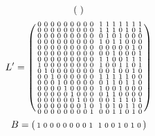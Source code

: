 \begin{example}
{\begin{equation*}
\begin{psmallmatrix}
        \end{psmallmatrix}
    \end{equation*}
    \begin{equation*}
        \setcounter{MaxMatrixCols}{17}
        L^\prime = \begin{psmallmatrix}
            0 & 0 & 0 & 0 & 0 & 0 & 0 & 0 & 0 & & 1 & 1 & 1 & 1 & 1 & 1 & 1 \\
            0 & 0 & 0 & 0 & 0 & 0 & 0 & 0 & 0 & & 1 & 1 & 1 & 0 & 1 & 0 & 1 \\
            0 & 0 & 0 & 0 & 0 & 0 & 0 & 0 & 0 & & 0 & 1 & 0 & 1 & 0 & 0 & 0 \\
            0 & 0 & 0 & 0 & 0 & 0 & 0 & 0 & 0 & & 1 & 0 & 1 & 1 & 0 & 0 & 0 \\
            0 & 0 & 0 & 0 & 0 & 0 & 0 & 0 & 0 & & 0 & 0 & 0 & 0 & 0 & 1 & 0 \\
            0 & 0 & 0 & 0 & 0 & 0 & 0 & 0 & 0 & & 0 & 0 & 1 & 0 & 0 & 0 & 1 \\
            0 & 0 & 0 & 0 & 0 & 0 & 0 & 0 & 0 & & 1 & 1 & 0 & 0 & 1 & 1 & 1 \\
            1 & 0 & 0 & 0 & 0 & 0 & 0 & 0 & 0 & & 1 & 0 & 0 & 1 & 1 & 0 & 1 \\
            0 & 1 & 0 & 0 & 0 & 0 & 0 & 0 & 0 & & 0 & 0 & 1 & 0 & 0 & 1 & 0 \\
            0 & 0 & 1 & 0 & 0 & 0 & 0 & 0 & 0 & & 1 & 1 & 1 & 1 & 1 & 0 & 0 \\
            0 & 0 & 0 & 1 & 0 & 0 & 0 & 0 & 0 & & 0 & 1 & 1 & 0 & 1 & 1 & 0 \\
            0 & 0 & 0 & 0 & 1 & 0 & 0 & 0 & 0 & & 1 & 0 & 0 & 1 & 0 & 0 & 0 \\
            0 & 0 & 0 & 0 & 0 & 1 & 0 & 0 & 0 & & 0 & 1 & 1 & 0 & 0 & 0 & 0 \\
            0 & 0 & 0 & 0 & 0 & 0 & 1 & 0 & 0 & & 0 & 0 & 1 & 1 & 1 & 0 & 1 \\
            0 & 0 & 0 & 0 & 0 & 0 & 0 & 1 & 0 & & 1 & 0 & 1 & 0 & 1 & 1 & 0 \\
            0 & 0 & 0 & 0 & 0 & 0 & 0 & 0 & 1 & & 0 & 0 & 1 & 1 & 0 & 1 & 0 \\
        \end{psmallmatrix}
    \end{equation*}
    \begin{equation*}
        \setcounter{MaxMatrixCols}{17}
        B = \begin{psmallmatrix}
            1 & 0 & 0 & 0 & 0 & 0 & 0 & 0 & 1 & & 1 & 0 & 0 & 1 & 0 & 1 & 0 \\

\end{psmallmatrix}
\end{equation*}}
\end{example}
